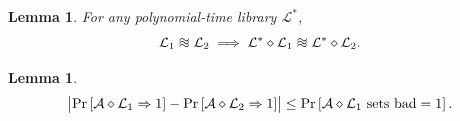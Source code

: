 \documentclass[12pt,openany]{book}
\newtheorem{lemma}[theorem]{Lemma}
\theoremstyle{definition}
\renewcommand{\abs}[1]{\left\lvert #1 \right\rvert}
\newcommand{\library}{\mathcal{L}}
\newcommand{\adversary}{\mathcal{A}}
\newcommand{\linking}{\diamond}
\newcommand*{\indist}{%
	\mathrel{\vcenter{\offinterlineskip
			\hbox{$\sim$}\vskip-.35ex\hbox{$\sim$}\vskip-.35ex\hbox{$\sim$}}}}
\newcommand{\outputs}{\Rightarrow}
\begin{document}
%		
	\begin{tcolorbox}[colframe=lemcolor,title={\color{white}\bf }]
		\begin{lemma}
			For any polynomial-time library $\library^*$, \[
			\library_{1}\indist\library_{2}\implies\library^*\linking\library_{1}\indist\library^*\linking\library_2.
			\]
		\end{lemma}
	\end{tcolorbox}
%		
	\vspace{20pt}
	\begin{tcolorbox}[colframe=lemcolor,title={\color{white}\bf Bad-Event Lemma}]
		\begin{lemma}
			\[
			\abs{\Pr\sbr{\adversary\linking\library_{1}\outputs 1}-\Pr\sbr{\adversary\linking\library_{2}\outputs 1}}\leq\Pr\sbr{\adversary\linking\library_{1}\ \text{sets bad} = 1}.
			\]
		\end{lemma}
	\end{tcolorbox}
%		
\end{document}
